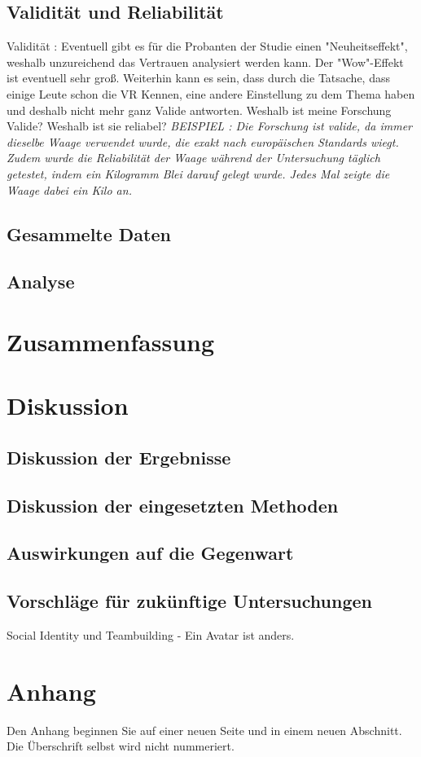 \documentclass[a4paper,11pt]{article}%
\renewcommand{\\}{\vspace*{0.5\baselineskip} \newline}
\begin{document}
		\subsection{Validität und Reliabilität}
		Validität : Eventuell gibt es für die Probanten der Studie einen "Neuheitseffekt", weshalb unzureichend das Vertrauen analysiert werden kann. Der "Wow"-Effekt ist eventuell sehr groß. Weiterhin kann es sein, dass durch die Tatsache, dass einige Leute schon die VR Kennen, eine andere Einstellung zu dem Thema haben und deshalb nicht mehr ganz Valide antworten.
		Weshalb ist meine Forschung Valide? Weshalb ist sie reliabel?	
		\textit{BEISPIEL : Die Forschung ist valide, da immer dieselbe Waage verwendet wurde, die exakt nach europäischen Standards wiegt. Zudem wurde die Reliabilität der Waage während der Untersuchung täglich getestet, indem ein Kilogramm Blei darauf gelegt wurde. Jedes Mal zeigte die Waage dabei ein Kilo an.}
		\subsection {Gesammelte Daten}
	
		\subsection{Analyse}
	\newpage
	\section{Zusammenfassung}
	\newpage
	\section{Diskussion}
		\subsection{Diskussion der Ergebnisse}
		\subsection{Diskussion der eingesetzten Methoden}
		\subsection{Auswirkungen auf die Gegenwart}
		\subsection{Vorschläge für zukünftige Untersuchungen}
		Social Identity und Teambuilding - Ein Avatar ist anders.
	
	\newpage
	\appendix	
	\section*{Anhang}
	Den Anhang beginnen Sie auf einer neuen Seite und in einem neuen Abschnitt. Die Überschrift selbst wird nicht nummeriert.
	\newpage



\end{document}
